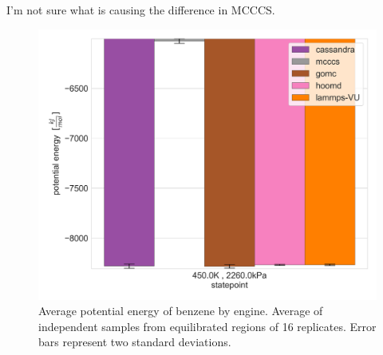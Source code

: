 I'm not sure what is causing the difference in MCCCS.
\begin{figure}[h!]
    \centering
    \includegraphics[width=0.8\linewidth,keepaspectratio]{figures/rep_study/benzeneUA_pe_summary.png}
    \caption{Average potential energy of benzene by engine. Average of independent samples from equilibrated regions of 16 replicates. Error bars represent two standard deviations.}\label{fig:benzene_pe}
\end{figure}

